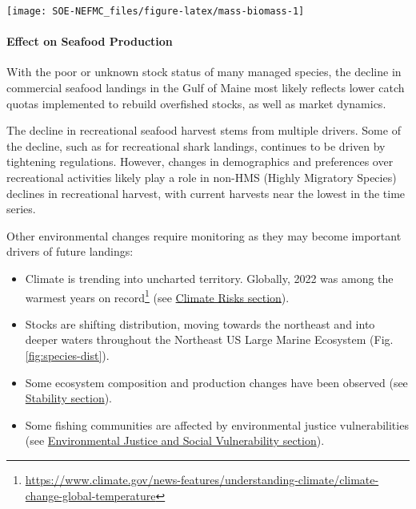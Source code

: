 \documentclass[
  10pt,
]{article}
\providecommand{\tightlist}{%
  \setlength{\itemsep}{0pt}\setlength{\parskip}{0pt}}
\let\origfigure\figure
\let\endorigfigure\endfigure
\renewenvironment{figure}[1][2] {
    \expandafter\origfigure\expandafter[H]
} {
    \endorigfigure
}
\begin{document}
\begin{figure}

{\centering \texttt{[image: SOE-NEFMC\_files/figure-latex/mass-biomass-1]} 

}

\caption{Spring (left) and fall (right) surveyed biomass from the state of Massachusetts inshore survey. The shaded area around each annual mean represents 2 standard deviations from the mean.}\label{fig:mass-biomass}
\end{figure}

\hypertarget{effect-on-seafood-production}{%
\paragraph{Effect on Seafood Production}\label{effect-on-seafood-production}}

With the poor or unknown stock status of many managed species, the decline in commercial seafood landings in the Gulf of Maine most likely reflects lower catch quotas implemented to rebuild overfished stocks, as well as market dynamics.

The decline in recreational seafood harvest stems from multiple drivers. Some of the decline, such as for recreational shark landings, continues to be driven by tightening regulations. However, changes in demographics and preferences over recreational activities likely play a role in non-HMS (Highly Migratory Species) declines in recreational harvest, with current harvests near the lowest in the time series.

Other environmental changes require monitoring as they may become important drivers of future landings:

\begin{itemize}
\tightlist
\item
  Climate is trending into uncharted territory. Globally, 2022 was among the warmest years on record\footnote{\url{https://www.climate.gov/news-features/understanding-climate/climate-change-global-temperature}} (see \protect\hyperlink{climate-and-ecosystem-productivity}{Climate Risks section}).
\item
  Stocks are shifting distribution, moving towards the northeast and into deeper waters throughout the Northeast US Large Marine Ecosystem (Fig. \ref{fig:species-dist}).
\item
  Some ecosystem composition and production changes have been observed (see \protect\hyperlink{stability}{Stability section}).
\item
  Some fishing communities are affected by environmental justice vulnerabilities (see \protect\hyperlink{social-vulnerability}{Environmental Justice and Social Vulnerability section}).
\end{itemize}
\end{document}
